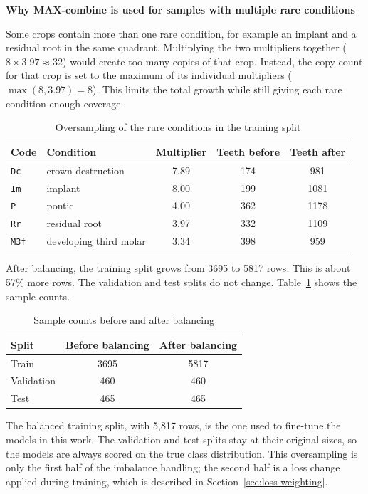 \documentclass[a4paper,12pt]{report}
\newcommand{\minisection}[1]{%
  \vspace{1ex}
  \noindent\textbf{#1}\par
  \vspace{0.5ex}
}
\begin{document}
\minisection{Why MAX-combine is used for samples with multiple rare conditions}

Some crops contain more than one rare condition, for example an implant and a residual root in the same quadrant. Multiplying the two multipliers together ($8 \times 3.97 \approx 32$) would create too many copies of that crop. Instead, the copy count for that crop is set to the maximum of its individual multipliers ($\max(8, 3.97) = 8$). This limits the total growth while still giving each rare condition enough coverage.

\begin{table}[H]
\centering
\caption{Oversampling of the rare conditions in the training split}
\begin{tabular}{llccc}
\toprule
Code & Condition & Multiplier & Teeth before & Teeth after \\
\midrule
\texttt{Dc}  & crown destruction      & 7.89 & 174 & 981 \\
\texttt{Im}  & implant                & 8.00 & 199 & 1081 \\
\texttt{P}   & pontic                 & 4.00 & 362 & 1178 \\
\texttt{Rr}  & residual root          & 3.97 & 332 & 1109 \\
\texttt{M3f} & developing third molar & 3.34 & 398 & 959 \\
\bottomrule
\end{tabular}
\end{table}

\newpage
After balancing, the training split grows from 3695 to 5817 rows. This is about 57\% more rows. The validation and test splits do not change. Table~\ref{tab:balance-rows} shows the sample counts.

\begin{table}[H]
\centering
\caption{Sample counts before and after balancing}
\label{tab:balance-rows}
\begin{tabular}{lcc}
\toprule
Split & Before balancing & After balancing \\
\midrule
Train & 3695 & 5817 \\
Validation & 460 & 460 \\
Test & 465 & 465 \\
\bottomrule
\end{tabular}
\end{table}

The balanced training split, with 5{,}817 rows, is the one used to fine-tune the models in this work. The validation and test splits stay at their original sizes, so the models are always scored on the true class distribution. This oversampling is only the first half of the imbalance handling; the second half is a loss change applied during training, which is described in Section~\ref{sec:loss-weighting}.
\end{document}
